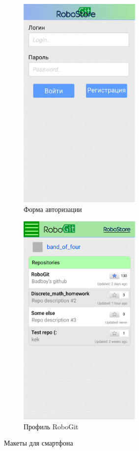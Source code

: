 \documentclass[12pt, a4paper]{article}
\begin{document}
\begin{figure}
  \centering
  \begin{subfigure}[b]{0.47\textwidth}
    \includegraphics[width=6cm]{png/auth_smart}
    \caption{Форма авторизации}
  \end{subfigure}
  \begin{subfigure}[b]{0.47\textwidth}
    \includegraphics[width=6cm]{png/git_profile_smart.png}
    \caption{Профиль RoboGit}
  \end{subfigure}
  \caption{Макеты для смартфона }
\end{figure}
\end{document}
